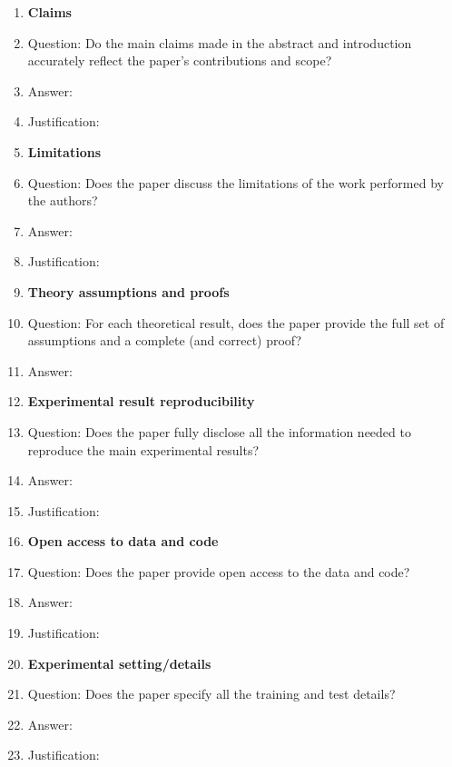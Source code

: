 \begin{enumerate}

\item {\bf Claims}
\item[] Question: Do the main claims made in the abstract and introduction accurately reflect the paper's contributions and scope?
\item[] Answer: \todo{[Yes/No/NA]}
\item[] Justification: 

\item {\bf Limitations}
\item[] Question: Does the paper discuss the limitations of the work performed by the authors?
\item[] Answer: \todo{[Yes]}
\item[] Justification: 

\item {\bf Theory assumptions and proofs}
\item[] Question: For each theoretical result, does the paper provide the full set of assumptions and a complete (and correct) proof?
\item[] Answer: 

\item {\bf Experimental result reproducibility}
\item[] Question: Does the paper fully disclose all the information needed to reproduce the main experimental results?
\item[] Answer: \todo{[Yes]}
\item[] Justification: 

\item {\bf Open access to data and code}
\item[] Question: Does the paper provide open access to the data and code?
\item[] Answer: \todo{[Yes/No]}
\item[] Justification: 

\item {\bf Experimental setting/details}
\item[] Question: Does the paper specify all the training and test details?
\item[] Answer: \todo{[Yes]}
\item[] Justification: 


\end{enumerate}
